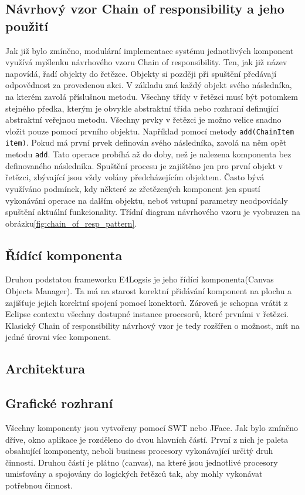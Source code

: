 \documentclass[ing,male,java,dept460]{diploma}		%
\begin{document}
\subsection{Návrhový vzor Chain of responsibility a jeho použití}
Jak již bylo zmíněno, modulární implementace systému jednotlivých komponent využívá myšlenku návrhového vzoru Chain of responsibility. Ten, jak již název napovídá, řadí objekty do řetězce. Objekty si později při spuštění předávají odpovědnost za provedenou akci. V základu zná každý objekt svého následníka, na kterém zavolá příslušnou metodu. Všechny třídy v řetězci musí být potomkem stejného předka, kterým je obvykle abstraktní třída nebo rozhraní definující abstraktní veřejnou metodu. Všechny prvky v řetězci je možno velice snadno vložit pouze pomocí prvního objektu. Například pomocí metody \texttt{add(ChainItem item)}. Pokud má první prvek definován svého následníka, zavolá na něm opět metodu \texttt{add}. Tato operace probíhá až do doby, než je nalezena komponenta bez definovaného následníka. Spuštění procesu je zajištěno jen pro první objekt v řetězci, zbývající jsou vždy volány předcházejícím objektem. Často bývá využíváno podmínek, kdy některé ze zřetězených komponent jen spustí vykonávání operace na dalším objektu, neboť vstupní parametry  neodpovídaly spuštění aktuální funkcionality\cite{chainOfResponsibility}. Třídní diagram návrhového vzoru je vyobrazen na obrázku\ref{fig:chain_of_resp_pattern}.

\subsection{Řídící komponenta}
Druhou podstatou frameworku E4Logsis je jeho řídící komponenta(Canvas Objects Manager). Ta má na starost korektní přidávání komponent na plochu a zajišťuje jejich korektní spojení pomocí konektorů. Zároveň je schopna vrátit z Eclipse contextu všechny dostupné instance procesorů, které prvními v řetězci. Klasický Chain of responsibility návrhový vzor je tedy rozšířen o možnost, mít na jedné úrovni více komponent.

\subsection{Architektura}

\subsection{Grafické rozhraní}
Všechny komponenty jsou vytvořeny pomocí SWT nebo JFace. Jak bylo zmíněno dříve, okno aplikace je rozděleno do dvou hlavních částí. První z nich je paleta obsahující komponenty, neboli business procesory vykonávající určitý druh činnosti. Druhou částí je plátno (canvas), na které jsou jednotlivé procesory umisťovány a spojovány do logických řetězců tak, aby mohly vykonávat potřebnou činnost.
\end{document}
